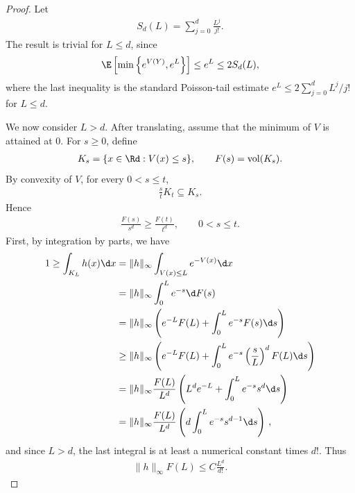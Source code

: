 \begin{proof}
    Let
    \begin{align}
        S_d(L)=\sum_{j=0}^d\frac{L^j}{j!}.
    \end{align}
    The result is trivial for $L\le d$, since
    \begin{align}
        \E\left[
            \min\left\{e^{V(Y)},e^L\right\}
            \right]
        \le e^L
        \le 2 S_d(L),
    \end{align}
    where the last inequality is the standard Poisson-tail estimate
    $e^L\le 2\sum_{j=0}^d L^j/j!$ for $L\le d$.

    We now consider $L>d$.
    After translating, assume that the minimum of $V$ is attained at $0$.
    For $s\ge0$, define
    \begin{align}
        K_s=\{x\in\Rd:V(x)\le s\},
        \qquad
        F(s)=\mathrm{vol}(K_s).
    \end{align}
    By convexity of $V$, for every $0<s\le t$,
    \begin{align}
        \frac{s}{t}K_t\subseteq K_s.
    \end{align}
    Hence
    \begin{align}
        \frac{F(s)}{s^d}
        \ge
        \frac{F(t)}{t^d},
        \qquad 0<s\le t.
        \label{eq:sublevel_volume_ratio_monotone}
    \end{align}
    First, by integration by parts, we have
    \begin{align}
        1
        \geq
        \int_{K_L} h(x)\d x
         & =
        \|h\|_\infty
        \int_{V(x)\le L} e^{-V(x)}\d x \\
         & =
        \|h\|_\infty
        \int_0^L e^{-s}\d F(s)         \\
         & =
        \|h\|_\infty
        \left(
        e^{-L}F(L)+\int_0^L e^{-s}F(s)\d s
        \right)                        \\
         & \geq
        \|h\|_\infty
        \left(
        e^{-L}F(L)+\int_0^L e^{-s} \left(\frac{s}{L}\right)^d  F(L)\d s
        \right)                        \\
         & =
        \|h\|_\infty
        \frac{F(L)}{L^d}
        \left(
        L^de^{-L}+\int_0^L e^{-s} s^d\d s
        \right)                        \\
         & =
        \|h\|_\infty
        \frac{F(L)}{L^d}
        \left(
        d \int_0^L e^{-s} s^{d-1}\d s
        \right)\,,
    \end{align}
    and since $L>d$, the last integral is at least a numerical constant times
    $d!$. Thus
    \begin{align}
        \|h\|_\infty F(L)
        \le
        C\frac{L^d}{d!}.
        \label{eq:log_concave_sublevel_volume_factorial}
    \end{align}


\end{proof}
